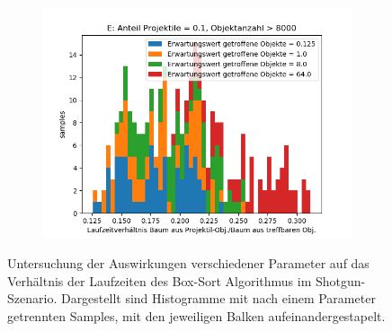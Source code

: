 \begin{figure}
\begin{subfigure}[t]{0.55\textwidth}
		\label{fig:boxsortChoice-shotgun-D}
	\end{subfigure}
~
	\begin{subfigure}[t]{0.55\textwidth}
		\centering
		\includegraphics[width=1\textwidth]{./res/boxsortChoice-shotgun-E.png}

		\label{fig:boxsortChoice-shotgun-E}
	\end{subfigure}


	\caption{Untersuchung der Auswirkungen verschiedener Parameter auf das Verhältnis der Laufzeiten des Box-Sort Algorithmus im Shotgun-Szenario. Dargestellt sind Histogramme mit nach einem Parameter getrennten Samples, mit den jeweiligen Balken aufeinandergestapelt.}
	\label{fig:boxsortChoice-shotgun}
\end{figure}



